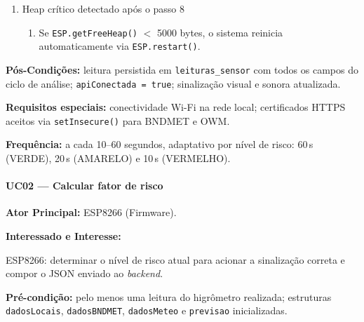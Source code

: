 \begin{enumerate}
  \renewcommand{\theenumi}{8a}
  \renewcommand{\labelenumi}{\theenumi.}
  \item Heap crítico detectado após o passo 8
  \begin{enumerate}
  \item Se \texttt{ESP.getFreeHeap()} $<$ 5000 bytes, o sistema
        reinicia automaticamente via \texttt{ESP.restart()}.
  \end{enumerate}
\end{enumerate}

\textbf{Pós-Condições:} leitura persistida em
\texttt{leituras\_sensor} com todos os campos do ciclo de análise;
\texttt{apiConectada = true}; sinalização visual e sonora atualizada.

\textbf{Requisitos especiais:} conectividade Wi-Fi na rede local;
certificados HTTPS aceitos via \texttt{setInsecure()} para BNDMET
e OWM.

\textbf{Frequência:} a cada 10--60 segundos, adaptativo por nível de
risco: 60\,s (VERDE), 20\,s (AMARELO) e 10\,s (VERMELHO).

\paragraph{UC02 --- Calcular fator de risco}\hfill\break

\textbf{Ator Principal:} ESP8266 (Firmware).

\textbf{Interessado e Interesse:}

ESP8266: determinar o nível de risco atual para acionar a
sinalização correta e compor o JSON enviado ao \textit{backend}.

\textbf{Pré-condição:} pelo menos uma leitura do higrômetro
realizada; estruturas \texttt{dadosLocais}, \texttt{dadosBNDMET},
\texttt{dadosMeteo} e \texttt{previsao} inicializadas.

